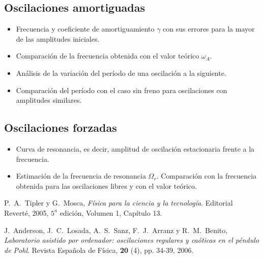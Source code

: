 \documentclass[11pt]{articulo}
\begin{document}
\subsection*{Oscilaciones amortiguadas}

\begin{itemize}

\item{Frecuencia y coeficiente de amortiguamiento $\gamma$ con sus errores para la mayor de las amplitudes iniciales.}
\item{Comparaci\'on de la frecuencia obtenida con el valor te\'orico $\omega_A$.}
\item{An\'alisis de la variaci\'on del per\'iodo de una oscilaci\'on a la siguiente.}
\item{Comparaci\'on del per\'iodo con el caso sin freno para oscilaciones con amplitudes similares.}

\end{itemize}

\subsection*{Oscilaciones forzadas}

\begin{itemize}

\item{Curva de resonancia, es decir, amplitud de oscilaci\'on estacionaria frente a la frecuencia.}
\item{Estimaci\'on de la frecuencia de resonancia $\Omega_r$. Comparaci\'on con la frecuencia obtenida para las oscilaciones libres y con el valor te\'orico.}

\end{itemize}



\begin{thebibliography}{X}

P.~A.~Tipler y G.~Mosca,
\textit{F\'isica para la ciencia y la tecnolog\'ia}. 
Editorial Revert\'e, 2005, $5^{a}$ edici\'on, Volumen 1, Cap\'itulo 13.

J.~Anderson, J.~C.~Losada, A.~S.~Sanz, F.~J.~Arranz y R.~M.~Benito,
\textit{Laboratorio asistido por ordenador: oscilaciones regulares y ca\'oticas en el p\'endulo de Pohl}.
Revista Espa\~nola de F\'isica, {\bf 20} (4), pp. 34-39, 2006.

\end{thebibliography}


\end{document}
